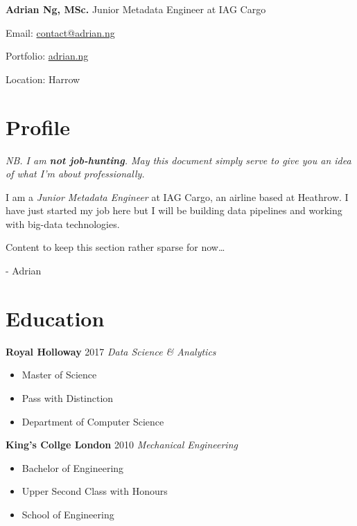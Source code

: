 \documentclass[letterpaper,11pt]{article}
\begin{document}
\noindent
\Large
\textbf{Adrian Ng, MSc.}
\newline
\small
Junior Metadata Engineer at IAG Cargo
\newline
\begin{description*}
	\item[Email:] \href{mailto:contact@adrian.ng}{contact@adrian.ng}
	\item[Portfolio:] \href{https://adrian.ng}{adrian.ng}
	\item[Location:] Harrow
\end{description*}
\hfill
\vspace{0.25cm}
\noindent
\begin{minipage}[t]{0.5\linewidth}
	\section{Profile}
	\textit{NB. I am \textbf{not job-hunting}. May this document simply serve to give you an idea of what I'm about professionally.}
	\par\quad

	I am a \textit{Junior Metadata Engineer} at IAG Cargo, an airline based at Heathrow. I have just started my job here but I will be building data pipelines and working with big-data technologies.
	\par\quad

	Content to keep this section rather sparse for now\dots
	\par\quad

	- Adrian
\end{minipage}
\hspace{0.2cm}
\begin{minipage}[t]{0.3\linewidth}
	\section{Education}
	\textbf{Royal Holloway} \hfill 2017
	\newline
	\textit{Data Science \& Analytics}
	\begin{itemize}[leftmargin=*, itemsep=0.1em]
		\item	Master of Science
		\item	Pass with Distinction
		\item 	Department of Computer Science
	\end{itemize}
	\vspace{0.15cm}
	\textbf{King's Collge London} \hfill 2010
	\newline
	\textit{Mechanical Engineering}
	\begin{itemize}[leftmargin=*, itemsep=0.1em]
		\item Bachelor of Engineering
		\item Upper Second Class with Honours
		\item School of Engineering
	\end{itemize}
\end{minipage}
\end{document}
